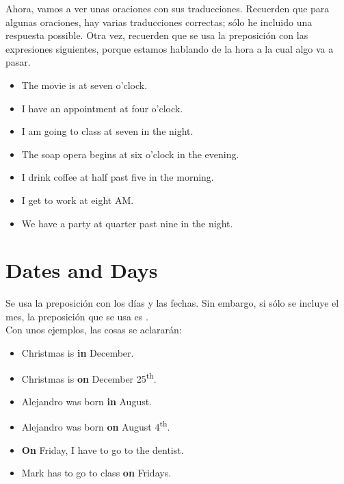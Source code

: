 Ahora, vamos a ver unas oraciones con sus traducciones.
Recuerden que para algunas oraciones, hay varias traducciones correctas;
s\'olo he incluido una respuesta possible.
Otra vez, recuerden que se usa la preposici\'on  con las expresiones siguientes,
porque estamos hablando de la hora a la cual algo va a pasar.

\begin{itemize}
	\item {}
		\arr The movie is at seven o'clock.
	\item {}
		\arr I have an appointment at four o'clock.
	\item {}
		\arr I am going to class at seven in the night.
	\item {}
		\arr The soap opera begins at six o'clock in the evening.
	\item {}
		\arr I drink coffee at half past five in the morning.
	\item {}
		\arr I get to work at eight AM.
	\item {}
		\arr We have a party at quarter past nine in the night.
\end{itemize}

\section{Dates and Days}
Se usa la preposici\'on \textbf{} con los d\'ias y las fechas.
Sin embargo, si s\'olo se incluye el mes, la preposici\'on que se usa es \textbf{}. \\

Con unos ejemplos, las cosas se aclarar\'an:
\begin{itemize}
	\item {} \arr Christmas is \textbf{in} December.
	\item {} \arr Christmas is \textbf{on} December 25\textsuperscript{th}.
	\item {} \arr Alejandro was born \textbf{in} August.
	\item {} \arr Alejandro was born \textbf{on} August 4\textsuperscript{th}.
	\item {} \arr \textbf{On} Friday, I have to go to the dentist.
	\item {} \arr Mark has to go to class \textbf{on} Fridays. 
\end{itemize}

